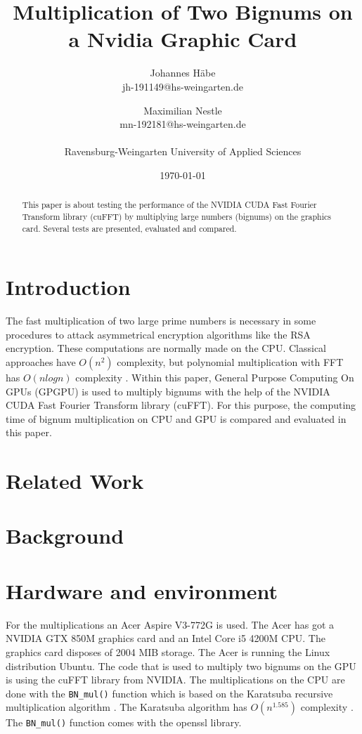 \documentclass[12pt,a4paper]{article}
\title{Multiplication of Two Bignums on a Nvidia Graphic Card}
\author{Johannes H\"abe  \\
	jh-191149@hs-weingarten.de
	\and 
	Maximilian Nestle \\
	mn-192181@hs-weingarten.de \\\\
	Ravensburg-Weingarten University of Applied Sciences
	}
\date{\today}
\begin{document}
\maketitle
%
\begin{abstract}
This paper is about testing the performance of the NVIDIA CUDA Fast Fourier Transform library (cuFFT) by multiplying large numbers (bignums) on the graphics card. Several tests are presented, evaluated and compared.
\end{abstract}

\section{Introduction}
The fast multiplication of two large prime numbers is necessary in some procedures to attack asymmetrical encryption algorithms like the RSA encryption. These computations are normally made on the CPU. Classical approaches have $O(n^2)$ complexity, but polynomial multiplication with FFT has $O(nlogn)$ complexity \cite{bantikyan2014big}. Within this paper, General Purpose Computing On GPUs (GPGPU) is used to multiply bignums with the help of the NVIDIA CUDA Fast Fourier Transform library (cuFFT). For this purpose, the computing time of bignum multiplication on CPU and GPU is compared and evaluated in this paper.

\section{Related Work}

\section{Background}

\newpage

\section{Hardware and environment}
For the multiplications an Acer Aspire V3-772G is used. The Acer has got a NVIDIA GTX 850M graphics card and an Intel Core i5 4200M CPU. The graphics card disposes of 2004 MIB storage. The Acer is running the Linux distribution Ubuntu. The code that is used to multiply two bignums on the GPU is using the cuFFT library from NVIDIA. The multiplications on the CPU are done with the \texttt{BN_mul()} function which is based on the Karatsuba recursive multiplication algorithm \cite{young1995bnmul}. The Karatsuba algorithm has $O(n^{1.585})$ complexity \cite{dietzfelbinger2012eff}. The \texttt{BN_mul()} function comes with the openssl library.
\end{document}
